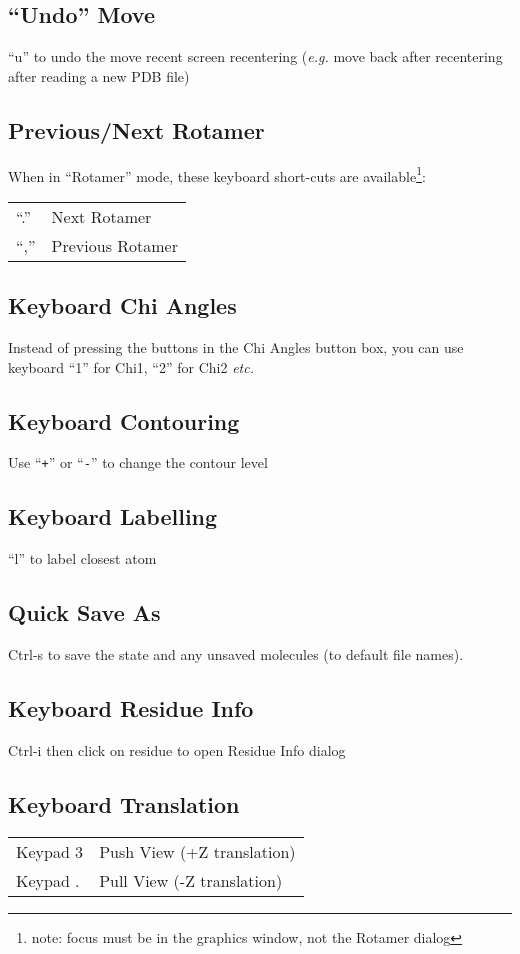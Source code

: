 \documentclass[twocolumn]{article}
\begin{document}
\subsection{``Undo'' Move}
``u'' to undo the move recent screen recentering (\emph{e.g.} move
back after recentering after reading a new PDB file)

\subsection{Previous/Next Rotamer}

When in ``Rotamer'' mode, these keyboard short-cuts are
available\footnote{note: focus must be in the graphics window, not
  the Rotamer dialog}:

\begin{tabular}{ll}
  ``.'' & Next Rotamer \\
  ``,'' & Previous Rotamer
\end{tabular}

\subsection{Keyboard Chi Angles}
Instead of pressing the buttons in the Chi Angles button box, you can
use keyboard ``1'' for Chi1, ``2'' for Chi2 \emph{etc.}

\subsection{Keyboard Contouring}

Use ``\texttt{+}'' or ``\texttt{-}'' to change the contour level

\subsection{Keyboard Labelling}
``l'' to label closest atom

\subsection{Quick Save As} 
   Ctrl-s to save the state and any unsaved molecules (to default file names).

\subsection{Keyboard Residue Info} 
   Ctrl-i then click on residue to open Residue Info dialog 

\subsection{Keyboard Translation}
\begin{tabular}{ll}
  Keypad 3 & Push View (+Z translation)\\
  Keypad . & Pull View (-Z translation)
\end{tabular}
\end{document}
